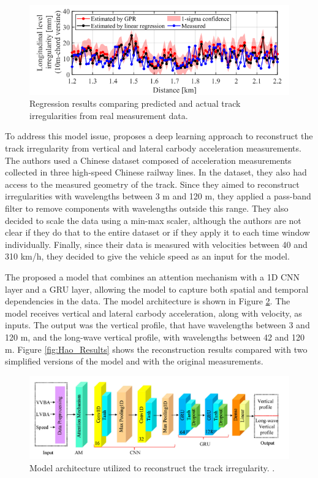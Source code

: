 \begin{figure}[H]
    \centering
    \includegraphics[width=12cm]{Cap2_LitReview/Track_Quality_Accel/Tsunashina (2024)/Results.png}
    \caption{Regression results comparing predicted and actual track irregularities from real measurement data. \cite{vibration7040049}}
    \label{fig:Tsunashina_Results}
\end{figure}

To address this model issue, \cite{Hao02012023} proposes a deep learning approach to reconstruct the track irregularity from vertical and lateral carbody acceleration measurements. The authors used a Chinese dataset composed of acceleration measurements collected in three high-speed Chinese railway lines. In the dataset, they also had access to the measured geometry of the track. Since they aimed to reconstruct irregularities with wavelengths between 3 m and 120 m, they applied a pass-band filter to remove components with wavelengths outside this range. They also decided to scale the data using a min-max scaler, although the authors are not clear if they do that to the entire dataset or if they apply it to each time window individually. Finally, since their data is measured with velocities between 40 and 310 km/h, they decided to give the vehicle speed as an input for the model.

The proposed a model that combines an attention mechanism with a 1D CNN layer and a GRU layer, allowing the model to capture both spatial and temporal dependencies in the data. The model architecture is shown in Figure \ref{fig:Hao_model}. The model receives vertical and lateral carbody acceleration, along with velocity, as inputs. The output was the vertical profile, that have wavelengths between 3 and 120 m, and the long-wave vertical profile, with wavelengths between 42 and 120 m. Figure \ref{fig:Hao_Results} shows the reconstruction results compared with two simplified versions of the model and with the original measurements.

\begin{figure}[H]
    \centering
    \includegraphics[width=12cm]{Cap2_LitReview/Track_Quality_Accel/Hao (2023)/Model_arch.png}
    \caption{Model architecture utilized to reconstruct the track irregularity. \cite{Hao02012023}.}
    \label{fig:Hao_model}
\end{figure}


